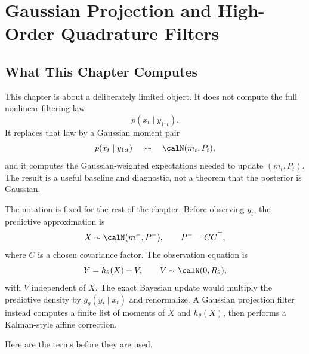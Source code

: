 \chapter[Gaussian And High-Order Filters]{Gaussian Projection and High-Order Quadrature Filters}
\label{ch:bf-highdim-gaussian-quadrature}

\section{What This Chapter Computes}
\label{sec:bf-hd-gq-purpose}

This chapter is about a deliberately limited object.  It does not compute the
full nonlinear filtering law
\[
  p(x_t\mid y_{1:t}).
\]
It replaces that law by a Gaussian moment pair
\[
  p(x_t\mid y_{1:t}) \quad\leadsto\quad \calN(m_t,P_t),
\]
and it computes the Gaussian-weighted expectations needed to update
\((m_t,P_t)\).  The result is a useful baseline and diagnostic, not a theorem
that the posterior is Gaussian.

The notation is fixed for the rest of the chapter.  Before observing \(y_t\),
the predictive approximation is
\[
  X\sim \calN(m^-,P^-),\qquad P^-=CC^\top ,
\]
where \(C\) is a chosen covariance factor.  The observation equation is
\[
  Y=h_\theta(X)+V,\qquad V\sim\calN(0,R_\theta),
\]
with \(V\) independent of \(X\).  The exact Bayesian update would multiply the
predictive density by \(g_\theta(y_t\mid x_t)\) and renormalize.  A Gaussian
projection filter instead computes a finite list of moments of \(X\) and
\(h_\theta(X)\), then performs a Kalman-style affine correction.

Here are the terms before they are used.

